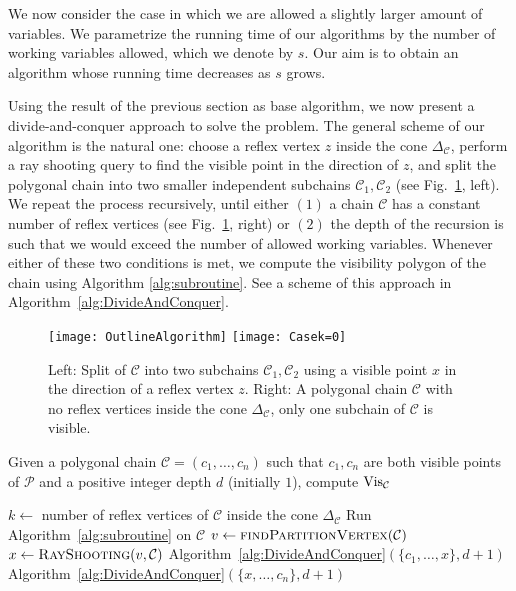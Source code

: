 \documentclass[a4paper]{article}
\newcommand{\coneC}{\ensuremath{{{\Delta_{\mathcal C}}}}}
\newcommand{\C}{\ensuremath{{\mathcal C}}}
\begin{document}
We now consider the case in which we are allowed a slightly larger amount of variables. We parametrize the running time of our algorithms by the number of working variables allowed, which we denote by $s$. Our aim is to obtain an algorithm whose running time decreases as $s$ grows. 

Using the result of the previous section as base algorithm, we now present a divide-and-conquer approach to solve the problem. The general scheme of our algorithm is the natural one: choose a reflex vertex $z$ inside the cone $\coneC$, perform a ray shooting query to find the visible point in the direction of $z$, and split the polygonal chain into two smaller independent subchains $\mathcal C_1, \mathcal C_2$ (see Fig.~\ref{fig:OutlineAlgorithm}, left). We repeat the process recursively, until either 
$(1)$ a chain $\mathcal C$ has a constant number of reflex vertices (see Fig.~\ref{fig:OutlineAlgorithm}, right) or 
$(2)$ the depth of the recursion is such that we would exceed the number of allowed working variables. 
Whenever either of these two conditions is met, we compute the visibility polygon of the chain using Algorithm \ref{alg:subroutine}. See a scheme of this approach in Algorithm~\ref{alg:DivideAndConquer}.




\begin{figure}[tb]
\centering
\texttt{[image: OutlineAlgorithm]}
\texttt{[image: Casek=0]}
\caption{Left: Split of $\mathcal C$ into two subchains $\mathcal C_1, \mathcal C_2$ using a visible point $x$ in the direction of a reflex vertex $z$.
Right: A polygonal chain $\mathcal C$ with no reflex vertices inside the cone $\coneC$, only one subchain of $\mathcal C$ is visible. }
\label{fig:OutlineAlgorithm}
\end{figure}

\begin{algorithm}
\caption{Given a polygonal chain $\mathcal C = (c_1, \ldots, c_n)$ such that $c_1, c_n$ are both visible points of $\mathcal P$ and a positive integer depth $d$ (initially $1$), compute $\mathrm{Vis}_{\mathcal{C}}$}
\label{alg:DivideAndConquer}
\begin{algorithmic}[1]
\STATE $k\gets$ number of reflex vertices of $\mathcal C$ inside the cone $\coneC$
	\STATE\label{algoconst} Run Algorithm~\ref{alg:subroutine} on $\C$
\ELSE
	\STATE $v\leftarrow \textsc{findPartitionVertex}(\mathcal C)$
\STATE $x\gets \textsc{RayShooting}(v,\C)$
	\STATE Algorithm~\ref{alg:DivideAndConquer}$ (\{c_1, \ldots, x\},d+1)$
	\STATE Algorithm~\ref{alg:DivideAndConquer}$ (\{x, \ldots, c_n\},d+1)$
\ENDIF
\end{algorithmic}
\end{algorithm}
\end{document}
